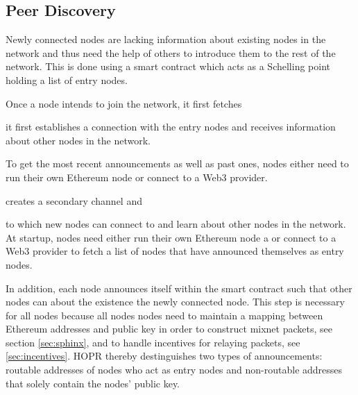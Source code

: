 \subsection{Peer Discovery}
\label{sec:p2p:peer-discovery}

Newly connected nodes are lacking information about existing nodes in the network and thus need the help of others to introduce them to the rest of the network. This is done using a smart contract which acts as a Schelling point holding a list of entry nodes.

Once a node intends to join the network, it first fetches


it first establishes a connection with the entry nodes and receives information about other nodes in the network.

To get the most recent announcements as well as past ones, nodes either need to run their own Ethereum node or connect to a Web3 provider.

creates a secondary channel and

to which new nodes can connect to and learn about other nodes in the network. At startup, nodes need either run their own Ethereum node a or connect to a Web3 provider to fetch a list of nodes that have announced themselves as entry nodes.

In addition, each node announces itself within the smart contract such that other nodes can about the existence the newly connected node. This step is necessary for all nodes because all nodes nodes need to maintain a mapping between Ethereum addresses and public key in order to construct mixnet packets, see section \ref{sec:sphinx}, and to handle incentives for relaying packets, see \ref{sec:incentives}. HOPR thereby destinguishes two types of announcements: routable addresses of nodes who act as entry nodes and non-routable addresses that solely contain the nodes' public key.

